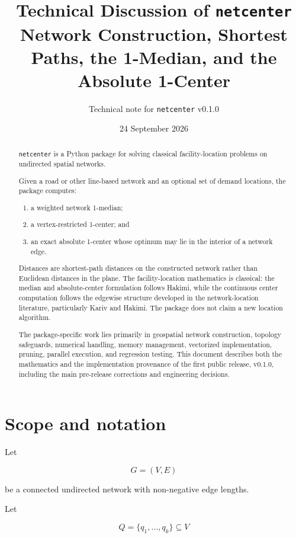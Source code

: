 \documentclass[11pt]{article}
\title{
\textbf{Technical Discussion of \texttt{netcenter}}\\
\large Network Construction, Shortest Paths, the 1-Median, and the Absolute 1-Center
}
\author{Technical note for \texttt{netcenter} v0.1.0}
\date{24 September 2026}
\begin{document}
\maketitle

\begin{abstract}

\texttt{netcenter} is a Python package for solving classical facility-location
problems on undirected spatial networks.

Given a road or other line-based network and an optional set of demand
locations, the package computes:

\begin{enumerate}[leftmargin=1.5em]
\item a weighted network 1-median;
\item a vertex-restricted 1-center; and
\item an exact absolute 1-center whose optimum may lie in the interior of a
network edge.
\end{enumerate}

Distances are shortest-path distances on the constructed network rather than
Euclidean distances in the plane. The facility-location mathematics is
classical: the median and absolute-center formulation follows Hakimi, while the
continuous center computation follows the edgewise structure developed in the
network-location literature, particularly Kariv and Hakimi. The package does
not claim a new location algorithm.

The package-specific work lies primarily in geospatial network construction,
topology safeguards, numerical handling, memory management, vectorized
implementation, pruning, parallel execution, and regression testing. This
document describes both the mathematics and the implementation provenance of
the first public release, v0.1.0, including the main pre-release corrections and
engineering decisions.

\end{abstract}

\section{Scope and notation}

Let

\[
G=(V,E)
\]

be a connected undirected network with non-negative edge lengths.

Let

\[
Q=\{q_1,\ldots,q_k\}\subseteq V
\]
\end{document}

